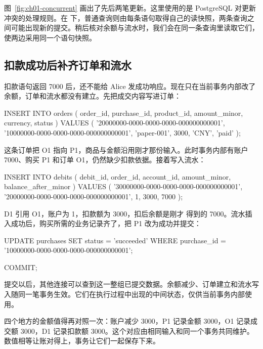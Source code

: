 图~\ref{fig:ch01-concurrent} 画出了先后两笔更新。这里使用的是 PostgreSQL 对更新冲突的处理规则。在  下，普通查询则由每条语句取得自己的读快照，两条查询之间可能出现新的提交。稍后核对余额与流水时，我们会在同一条查询里读取它们，使两边采用同一个语句快照。



\subsection*{扣款成功后补齐订单和流水}

扣款语句返回 7000 后，还不能给 Alice 发成功响应。现在只在当前事务内部改了余额，订单和流水都没有建立。先把成交内容写进订单：

\begin{BookCode}
INSERT INTO orders (
    order_id, purchase_id, product_id,
    amount_minor, currency, status
) VALUES (
    '20000000-0000-0000-0000-000000000001',
    '10000000-0000-0000-0000-000000000001',
    'paper-001', 3000, 'CNY', 'paid'
);
\end{BookCode}

这条订单把 O1 指向 P1，商品与金额沿用刚才那份输入。此时事务内部有账户 7000、购买 P1 和订单 O1，仍然缺少扣款依据。接着写入流水：

\begin{BookCode}
INSERT INTO debits (
    debit_id, order_id, account_id,
    amount_minor, balance_after_minor
) VALUES (
    '30000000-0000-0000-0000-000000000001',
    '20000000-0000-0000-0000-000000000001',
    1, 3000, 7000
);
\end{BookCode}

D1 引用 O1，账户为 1，扣款额为 3000，扣后余额是刚才  得到的 7000。流水插入成功后，购买所需的业务记录齐了，把 P1 改为成功并提交：

\begin{BookCode}
UPDATE purchases
SET status = 'succeeded'
WHERE purchase_id = '10000000-0000-0000-0000-000000000001';

COMMIT;
\end{BookCode}

提交以后，其他连接可以查到这一整组已提交数据。余额减少、订单建立和流水写入随同一笔事务生效。它们在执行过程中出现的中间状态，仅供当前事务内部使用。

四个地方的金额值得再对照一次：账户减少 3000，P1 记录金额 3000，O1 记录成交额 3000，D1 记录扣款额 3000。这个对应由相同输入和同一个事务共同维护。数值相等让账对得上，事务让它们一起保存下来。

